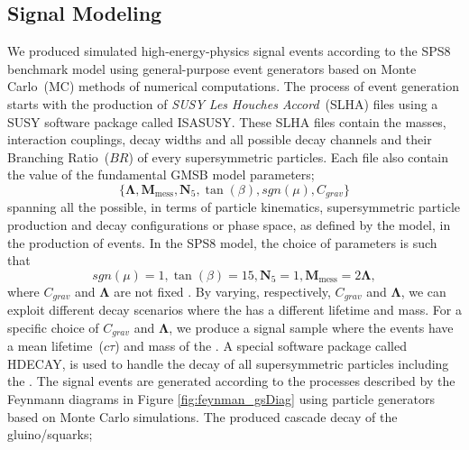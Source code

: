 \subsection{Signal Modeling}
We produced simulated high-energy-physics signal events according to the SPS8 benchmark model using  general-purpose event generators based on Monte Carlo~(MC) methods of numerical computations. The process of event generation starts with the production of \textit{SUSY Les Houches Accord}~(SLHA) files using a SUSY software package called \textsf{ISASUSY}\cite{ISAJET}. These SLHA files contain the masses, interaction couplings, decay widths and all possible decay channels and their Branching Ratio~($BR$) of every supersymmetric particles. Each file also contain the value of the fundamental GMSB model parameters;
\begin{equation}\label{eq:SUSYPARMS} 
\Big\{ \mathbf{\Lambda}, \mathbf{M}_{\mbox{mess}}, \mathbf{N}_{5}, \tan(\beta), sgn(\mu), C_{grav}\Big\} 
\end{equation}
spanning all the possible, in terms of particle kinematics, supersymmetric particle production  and decay configurations or phase space, as defined by the model, in the production of events. In the SPS8 model, the choice of parameters is such that
\begin{equation}\label{eq:SPS8PARM}
sgn(\mu)= 1, \tan(\beta) = 15, \mathbf{N}_{5} = 1, \mathbf{M}_{\mbox{mess}} = 2\mathbf{\Lambda},
\end{equation}
where $C_{grav}$ and $\mathbf{\Lambda} $ are not fixed . By varying, respectively, $C_{grav}$ and $\mathbf{\Lambda}$, we can exploit different decay scenarios where the \PSneutralinoOne has a different lifetime and mass. For a specific choice of $C_{grav}$ and $\mathbf{\Lambda} $, we produce a signal sample where the events have a mean lifetime~($c\tau$) and mass of the \PSneutralinoOne. A special software package called \textsf{HDECAY}, is used to handle the decay of all supersymmetric particles including the \PSneutralinoOne.%
\newline
The signal events are generated according to the processes described by the Feynmann diagrams in Figure \ref{fig:feynman_gsDiag} using particle generators based on Monte Carlo simulations.
The produced \PSneutralinoOne cascade decay of the gluino/squarks; 

